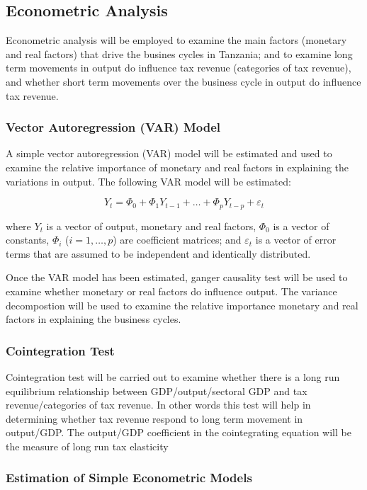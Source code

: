 \documentclass[12pt,a4paper,final]{article}
\begin{document}
\subsection{Econometric Analysis}

Econometric analysis will be employed to examine the main factors (monetary and real factors) that drive the busines cycles in Tanzania; and to examine long term movements in output do influence tax revenue (categories of tax revenue), and whether short term movements over the business cycle in output do influence tax revenue.

\subsubsection{Vector Autoregression (VAR) Model} 

A simple vector autoregression (VAR) model will be estimated and used to examine the relative importance of monetary and real factors in explaining the variations in output. The following VAR model will be estimated:

\[ Y_t = \Phi_0 +\Phi_1 Y_{t-1} + \ldots + \Phi_p Y_{t-p} + \varepsilon_t \]

where $Y_t$ is a vector of output, monetary and real factors, $\Phi_0$ is a vector of constants, $\Phi_i$ ($i=1,\ldots,p$) are coefficient matrices; and $\varepsilon_t$ is a vector of error terms that are assumed to be independent and identically distributed.

Once the VAR model has been estimated, ganger causality test will be used to examine whether monetary or real factors do influence output. The variance decompostion will be used to examine the relative importance monetary and real factors in explaining the business cycles.

\subsubsection{Cointegration Test}

Cointegration test will be carried out to examine whether there is a long run equilibrium relationship between GDP/output/sectoral GDP and tax revenue/categories of tax revenue. In other words this test will help in determining whether tax revenue respond to long term movement in output/GDP. The output/GDP coefficient in the cointegrating equation will be the measure of long run tax elasticity

\subsubsection{Estimation of Simple Econometric Models}
\end{document}
